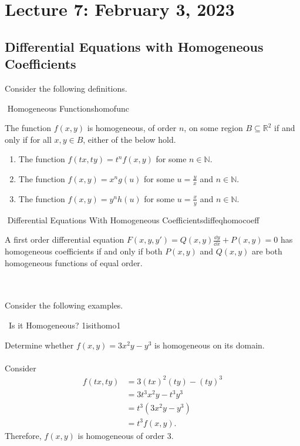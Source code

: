 \section{Lecture 7: February 3, 2023}

\subsection{Differential Equations with Homogeneous Coefficients}

    Consider the following definitions.
    \begin{definition}{\Stop\,\,Homogeneous Functions}{homofunc}

        The function \(f(x,y)\) is homogeneous, of order \(n\), on some region \(B\subseteq\mathbb{R}^2\) if and only if for all \(x,y\in B\), either of the below hold.
        \begin{enumerate}
            \item The function \(f(tx,ty)=t^nf(x,y)\) for some \(n\in\mathbb{N}\).
            \item The function \(f(x,y)=x^ng(u)\) for some \(u=\frac{y}{x}\) and \(n\in\mathbb{N}\).
            \item The function \(f(x,y)=y^nh(u)\) for some \(u=\frac{x}{y}\) and \(n\in\mathbb{N}\).
        \end{enumerate}

    \end{definition}
    \begin{definition}{\Stop\,\,Differential Equations With Homogeneous Coefficients}{diffeqhomocoeff}

        A first order differential equation \(F(x,y,y')=Q(x,y)\frac{\dd y}{\dd x}+P(x,y)=0\) has homogeneous coefficients if and only if both \(P(x,y)\) and \(Q(x,y)\) are both homogeneous functions of equal order.
        
    \end{definition}
    \vphantom
    \\
    \\
    Consider the following examples.
    \begin{example}{\Difficulty\,\Difficulty\,\,Is it Homogeneous? 1}{isithomo1}

        Determine whether \(f(x,y)=3x^2y-y^3\) is homogeneous on its domain.
        \\
        \\
        Consider
        \begin{align*}
            f(tx,ty)&=3(tx)^2(ty)-(ty)^3 \\
            &=3t^3x^2y-t^3y^3 \\
            &=t^3(3x^2y-y^3) \\
            &=t^3f(x,y).
        \end{align*}
        Therefore, \(f(x,y)\) is homogeneous of order \(3\).

    \end{example}
